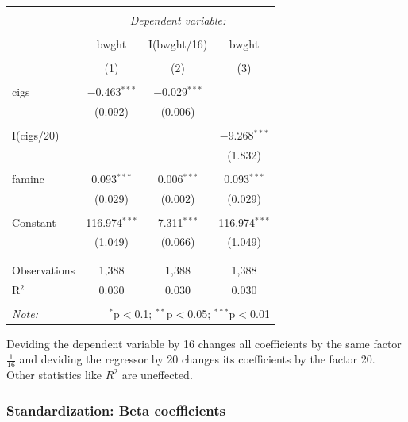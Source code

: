 \documentclass[]{book}
\begin{document}
\begin{table}[!htbp] \centering 
  \caption{} 
  \label{} 
\begin{tabular}{@{\extracolsep{5pt}}lccc} 
\\[-1.8ex]\hline 
\hline \\[-1.8ex] 
 & \multicolumn{3}{c}{\textit{Dependent variable:}} \\ 
\cline{2-4} 
\\[-1.8ex] & bwght & I(bwght/16) & bwght \\ 
\\[-1.8ex] & (1) & (2) & (3)\\ 
\hline \\[-1.8ex] 
 cigs & $-$0.463$^{***}$ & $-$0.029$^{***}$ &  \\ 
  & (0.092) & (0.006) &  \\ 
  & & & \\ 
 I(cigs/20) &  &  & $-$9.268$^{***}$ \\ 
  &  &  & (1.832) \\ 
  & & & \\ 
 faminc & 0.093$^{***}$ & 0.006$^{***}$ & 0.093$^{***}$ \\ 
  & (0.029) & (0.002) & (0.029) \\ 
  & & & \\ 
 Constant & 116.974$^{***}$ & 7.311$^{***}$ & 116.974$^{***}$ \\ 
  & (1.049) & (0.066) & (1.049) \\ 
  & & & \\ 
\hline \\[-1.8ex] 
Observations & 1,388 & 1,388 & 1,388 \\ 
R$^{2}$ & 0.030 & 0.030 & 0.030 \\ 
\hline 
\hline \\[-1.8ex] 
\textit{Note:}  & \multicolumn{3}{r}{$^{*}$p$<$0.1; $^{**}$p$<$0.05; $^{***}$p$<$0.01} \\ 
\end{tabular} 
\end{table}

Deviding the dependent variable by 16 changes all coefficients by the
same factor \(\frac{1}{16}\) and deviding the regressor by 20 changes
its coefficients by the factor 20. Other statistics like \(R^2\) are
uneffected.

\hypertarget{standardization-beta-coefficients}{%
\subsubsection{Standardization: Beta
coefficients}\label{standardization-beta-coefficients}}
\end{document}
